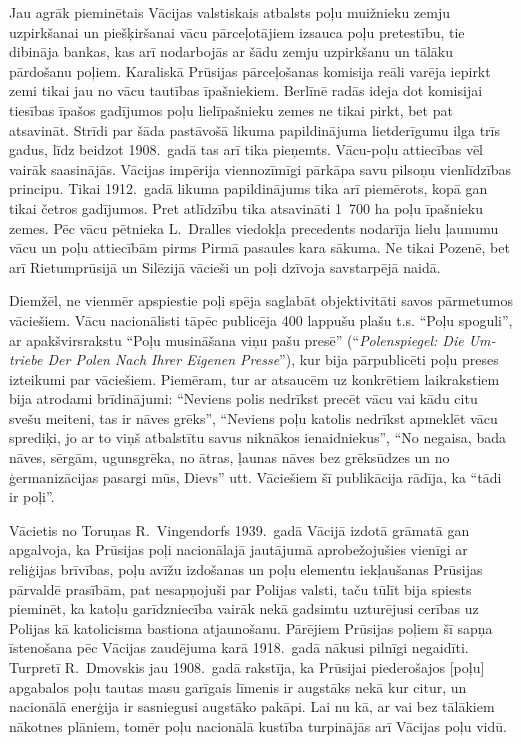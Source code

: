 \documentclass[twoside,a5paper,12pt,fleqn,openany]{extbook}
\newcommand{\detxti}[1]{\textit{\textgerman{#1}}}
\begin{document}
Jau agrāk pieminētais Vācijas valstiskais atbalsts poļu muižnieku zemju uzpirkšanai un piešķiršanai vācu pārceļotājiem izsauca poļu pretestību, tie dibināja bankas, kas arī nodarbojās ar šādu zemju uzpirkšanu un tālāku pārdošanu poļiem. Karaliskā Prūsijas pārceļošanas komisija reāli varēja iepirkt zemi tikai jau no vācu tautības īpašniekiem. Berlīnē radās ideja dot komisijai tiesības īpašos gadījumos poļu lielīpašnieku zemes ne tikai pirkt, bet pat atsavināt. Strīdi par šāda pastāvošā likuma papildinājuma lietderīgumu ilga trīs gadus, līdz beidzot 1908.~gadā tas arī tika pieņemts. Vācu-poļu attiecības vēl vairāk saasinājās. Vācijas impērija viennozīmīgi pārkāpa savu pilsoņu vienlīdzības principu. Tikai 1912.~gadā likuma papildinājums tika arī piemērots, kopā gan tikai četros gadījumos. Pret atlīdzību tika atsavināti 1~700 ha poļu īpašnieku zemes. Pēc vācu pētnieka L.~Dralles viedokļa precedents nodarīja lielu ļaunumu vācu un poļu attiecībām pirms Pirmā pasaules kara sākuma. Ne tikai Pozenē, bet arī Rietumprūsijā un Silēzijā vācieši un poļi dzīvoja savstarpējā naidā.

Diemžēl, ne vienmēr apspiestie poļi spēja saglabāt objektivitāti savos pārmetumos vāciešiem. Vācu nacionālisti tāpēc publicēja 400 lappušu plašu t.s. ``Poļu spoguli'', ar apakšvirsrakstu ``Poļu musināšana viņu pašu presē'' (``\detxti{Polenspiegel: Die Umtriebe Der Polen Nach Ihrer Eigenen Presse}''), kur bija pārpublicēti poļu preses izteikumi par vāciešiem. Piemēram, tur ar atsaucēm uz konkrētiem laikrakstiem bija atrodami brīdinājumi: ``Neviens polis nedrīkst precēt vācu vai kādu citu svešu meiteni, tas ir nāves grēks'', ``Neviens poļu katolis nedrīkst apmeklēt vācu sprediķi, jo ar to viņš atbalstītu savus niknākos ienaidniekus'', ``No negaisa, bada nāves, sērgām, ugunsgrēka, no ātras, ļaunas nāves bez grēksūdzes un no ģermanizācijas pasargi mūs, Dievs'' utt. Vāciešiem šī publikācija rādīja, ka ``tādi ir poļi''.

Vācietis no Toruņas R.~Vingendorfs 1939.~gadā Vācijā izdotā grāmatā gan apgalvoja, ka Prūsijas poļi nacionālajā jautājumā aprobežojušies vienīgi ar reliģijas brīvības, poļu avīžu izdošanas un poļu elementu iekļaušanas Prūsijas pārvaldē prasībām, pat nesapņojuši par Polijas valsti, taču tūlīt bija spiests pieminēt, ka katoļu garīdzniecība vairāk nekā gadsimtu uzturējusi cerības uz Polijas kā katolicisma bastiona atjaunošanu. Pārējiem Prūsijas poļiem šī sapņa īstenošana pēc Vācijas zaudējuma karā 1918.~gadā nākusi pilnīgi negaidīti. Turpretī R.~Dmovskis jau 1908.~gadā rakstīja, ka Prūsijai piederošajos [poļu] apgabalos poļu tautas masu garīgais līmenis ir augstāks nekā kur citur, un nacionālā enerģija ir sasniegusi augstāko pakāpi. Lai nu kā, ar vai bez tālākiem nākotnes plāniem, tomēr poļu nacionālā kustība turpinājās arī Vācijas poļu vidū.
\end{document}
